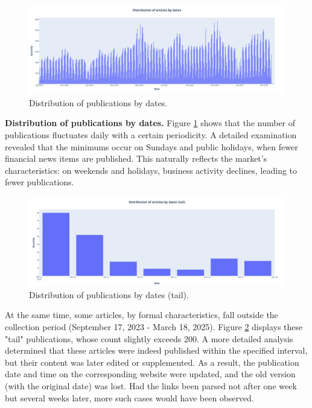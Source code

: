 \begin{figure}[H]
    \centering
    \includegraphics[width=1\linewidth]{img/articles_dist_by_dates.png}
    \caption{Distribution of publications by dates.}
    \label{fig:dist_by_dates}
\end{figure}

\textbf{Distribution of publications by dates.} Figure \ref{fig:dist_by_dates} shows that the number of publications
fluctuates daily with a certain periodicity. A detailed examination revealed that the minimums occur on Sundays and
public holidays, when fewer financial news items are published. This naturally reflects the market’s characteristics:
on weekends and holidays, business activity declines, leading to fewer publications.

\begin{figure}[H]
    \centering
    \includegraphics[width=1\linewidth]{img/articles_dist_by_dates_tail.png}
    \caption{\label{fig:dist_by_dates_tail}Distribution of publications by dates (tail).}
\end{figure}

At the same time, some articles, by formal characteristics, fall outside the collection period (September 17, 2023 - March 18, 2025).
Figure \ref{fig:dist_by_dates_tail} displays these "tail" publications, whose count slightly exceeds 200. A more detailed analysis
determined that these articles were indeed published within the specified interval, but their content was later edited or supplemented.
As a result, the publication date and time on the corresponding website were updated, and the old version (with the original date) was
lost. Had the links been parsed not after one week but several weeks later, more such cases would have been observed.

